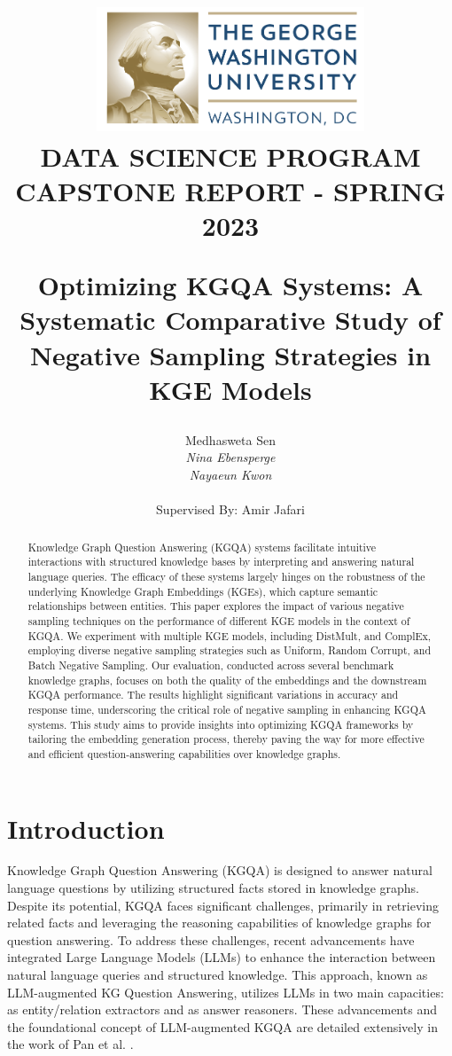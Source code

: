 \documentclass{article}
\title{
    \includegraphics[width=0.6\textwidth]{gw.png} \\ %
    \vspace{10mm}
    {\Huge \textbf{}{DATA SCIENCE PROGRAM}} \\
    {\Large \textbf{CAPSTONE REPORT - SPRING 2023}}

    {\Large Optimizing KGQA Systems: A Systematic Comparative Study of Negative Sampling Strategies in KGE Models}
}
\author{
    Medhasweta Sen \\
    \textit{Nina Ebensperge} \\
    \textit{Nayaeun Kwon} \\
    \\[1em]
    Supervised By: Amir Jafari
}
\date{} %
\begin{document}
\maketitle


\date{} %


\maketitle
\thispagestyle{empty} %

\begin{abstract}

Knowledge Graph Question Answering (KGQA) systems facilitate intuitive interactions with structured knowledge bases by interpreting and answering natural language queries. The efficacy of these systems largely hinges on the robustness of the underlying Knowledge Graph Embeddings (KGEs), which capture semantic relationships between entities. This paper explores the impact of various negative sampling techniques on the performance of different KGE models in the context of KGQA. We experiment with multiple KGE models, including DistMult, and ComplEx, employing diverse negative sampling strategies such as Uniform, Random Corrupt, and Batch Negative Sampling. Our evaluation, conducted across several benchmark knowledge graphs, focuses on both the quality of the embeddings and the downstream KGQA performance. The results highlight significant variations in accuracy and response time, underscoring the critical role of negative sampling in enhancing KGQA systems. This study aims to provide insights into optimizing KGQA frameworks by tailoring the embedding generation process, thereby paving the way for more effective and efficient question-answering capabilities over knowledge graphs.

\end{abstract}

\vspace{40mm} %
\tableofcontents
\newpage %
\section{Introduction}

Knowledge Graph Question Answering (KGQA) is designed to answer natural language questions by utilizing structured facts stored in knowledge graphs. Despite its potential, KGQA faces significant challenges, primarily in retrieving related facts and leveraging the reasoning capabilities of knowledge graphs for question answering. To address these challenges, recent advancements have integrated Large Language Models (LLMs) to enhance the interaction between natural language queries and structured knowledge. This approach, known as LLM-augmented KG Question Answering, utilizes LLMs in two main capacities: as entity/relation extractors and as answer reasoners. These advancements and the foundational concept of LLM-augmented KGQA are detailed extensively in the work of Pan et al. \parencite{Pan2023UnifyingLL}.
\end{document}
